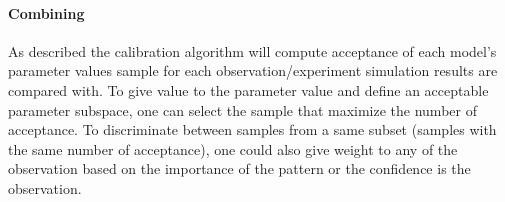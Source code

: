 \documentclass[a4paper, justified,marginals=raggedright]{tufte-handout}
\begin{document}
\paragraph{Combining}
As described the calibration algorithm will compute acceptance of each model's parameter values sample for each observation/experiment simulation results are compared with. To give value to the parameter value and define an acceptable parameter subspace, one  can select the sample that maximize the number of acceptance. To discriminate between samples from a same subset (samples with the same number of acceptance), one could also give weight to any of the observation based on the importance of the pattern or the confidence is the observation.
\end{document}
